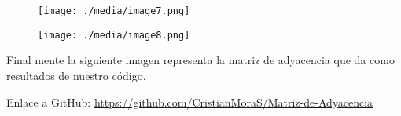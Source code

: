 \documentclass[12pt]{article}
\renewcommand{\_}{\kern-1.5pt\textunderscore\kern-1.5pt}
\begin{document}

\par


\vspace{\baselineskip}



\begin{figure}[H]
	\begin{Center}
		\texttt{[image: ./media/image7.png]}
	\end{Center}
\end{figure}



\par




\begin{figure}[H]
	\begin{Center}
		\texttt{[image: ./media/image8.png]}
	\end{Center}
\end{figure}



\par


\vspace{\baselineskip}

\vspace{\baselineskip}

\vspace{\baselineskip}

\vspace{\baselineskip}

\vspace{\baselineskip}

\vspace{\baselineskip}

\vspace{\baselineskip}

\vspace{\baselineskip}

\vspace{\baselineskip}
Final mente la siguiente imagen representa la matriz de adyacencia que da como resultados de nuestro código.\par

\par


\vspace{\baselineskip}
Enlace a GitHub: \href{https://github.com/CristianMoraS/Matriz-de-Adyacencia}{https://github.com/CristianMoraS/Matriz-de-Adyacencia}\par


\vspace{\baselineskip}

\printbibliography
\end{document}
